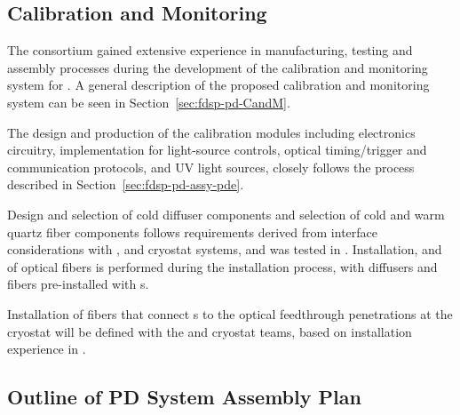 \subsection{Calibration and Monitoring}
\label{sec:fdsp-pd-assy-CandM}

The consortium gained extensive experience in manufacturing, testing and assembly processes %
during the development of the calibration and monitoring system for .
A general description of the proposed calibration and monitoring system can be seen in  Section~\ref{sec:fdsp-pd-CandM}. 

The design and production of the calibration modules including electronics circuitry,   implementation for light-source controls, optical timing/trigger and  communication protocols, and UV light sources, closely follows the process described in Section~\ref{sec:fdsp-pd-assy-pde}.

Design and selection of cold diffuser components and selection of cold and warm quartz fiber components follows requirements derived from interface considerations with ,   and cryostat systems, %
and was tested in .
Installation,  and  of optical fibers is performed during the  installation process, with diffusers and  fibers pre-installed with s.

Installation of fibers that connect s %
to the optical feedthrough penetrations at the cryostat will be defined with the  and cryostat teams, based on installation experience in . 

\subsection{Outline of PD System Assembly Plan}
\label{sec:fdsp-pd-assy-Assby-plan}


